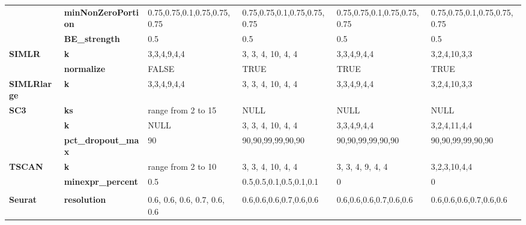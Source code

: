 \documentclass[11pt, a4paper]{article}\usepackage[]{graphicx}\usepackage[]{color}
\begin{document}
\begin{table}[htbp]
{\begin{tabular}{rp{5.585em}llll}
          & \textbf{minNonZeroPortion} & \multicolumn{1}{p{13.335em}}{0.75,0.75,0.1,0.75,0.75,0.75} & \multicolumn{1}{p{10.165em}}{0.75,0.75,0.1,0.75,0.75,0.75} & \multicolumn{1}{p{9.085em}}{0.75,0.75,0.1,0.75,0.75,0.75} & \multicolumn{1}{p{9.835em}}{0.75,0.75,0.1,0.75,0.75,0.75} \\
          & \textbf{BE\_strength} & 0.5   & 0.5   & 0.5   & 0.5 \\
    \midrule
    \multicolumn{1}{l}{\textbf{SIMLR}} & \textbf{k} & \multicolumn{1}{p{13.335em}}{3,3,4,9,4,4} & \multicolumn{1}{p{10.165em}}{3, 3, 4, 10, 4, 4} & \multicolumn{1}{p{9.085em}}{3,3,4,9,4,4} & \multicolumn{1}{p{9.835em}}{3,2,4,10,3,3} \\
          & \textbf{normalize} & \multicolumn{1}{p{13.335em}}{FALSE} & \multicolumn{1}{p{10.165em}}{TRUE} & \multicolumn{1}{p{9.085em}}{TRUE} & \multicolumn{1}{p{9.835em}}{TRUE} \\
    \midrule
    \multicolumn{1}{l}{\textbf{SIMLRlarge}} & \textbf{k} & \multicolumn{1}{p{13.335em}}{3,3,4,9,4,4} & \multicolumn{1}{p{10.165em}}{3, 3, 4, 10, 4, 4} & \multicolumn{1}{p{9.085em}}{3,3,4,9,4,4} & \multicolumn{1}{p{9.835em}}{3,2,4,10,3,3} \\
    \midrule
    \multicolumn{1}{l}{\textbf{SC3}} & \textbf{ks} & \multicolumn{1}{p{13.335em}}{range from 2 to 15} & \multicolumn{1}{p{10.165em}}{NULL} & \multicolumn{1}{p{9.085em}}{NULL} & \multicolumn{1}{p{9.835em}}{NULL} \\
          & \textbf{k} & \multicolumn{1}{p{13.335em}}{NULL} & \multicolumn{1}{p{10.165em}}{3, 3, 4, 10, 4, 4} & \multicolumn{1}{p{9.085em}}{3,3,4,9,4,4} & \multicolumn{1}{p{9.835em}}{3,2,4,11,4,4} \\
          & \textbf{pct\_dropout\_max} & 90    & \multicolumn{1}{p{10.165em}}{90,90,99,99,90,90} & \multicolumn{1}{p{9.085em}}{90,90,99,99,90,90} & \multicolumn{1}{p{9.835em}}{90,90,99,99,90,90} \\
    \midrule
    \multicolumn{1}{l}{\textbf{TSCAN}} & \textbf{k} & \multicolumn{1}{p{13.335em}}{range from 2 to 10} & \multicolumn{1}{p{10.165em}}{3, 3, 4, 10, 4, 4} & \multicolumn{1}{p{9.085em}}{3, 3, 4, 9, 4, 4} & \multicolumn{1}{p{9.835em}}{3,2,3,10,4,4} \\
          & \textbf{minexpr\_percent} & 0.5   & \multicolumn{1}{p{10.165em}}{0.5,0.5,0.1,0.5,0.1,0.1} & 0     & 0 \\
          & \multicolumn{1}{l}{} &       &       &       &  \\
    \midrule
    \multicolumn{1}{l}{\textbf{Seurat}} & \textbf{resolution} & \multicolumn{1}{p{13.335em}}{0.6, 0.6, 0.6, 0.7, 0.6, 0.6} & \multicolumn{1}{p{10.165em}}{0.6,0.6,0.6,0.7,0.6,0.6} & \multicolumn{1}{p{9.085em}}{0.6,0.6,0.6,0.7,0.6,0.6} & \multicolumn{1}{p{9.835em}}{0.6,0.6,0.6,0.7,0.6,0.6} \\

\end{tabular}}
\end{table}
\end{document}
